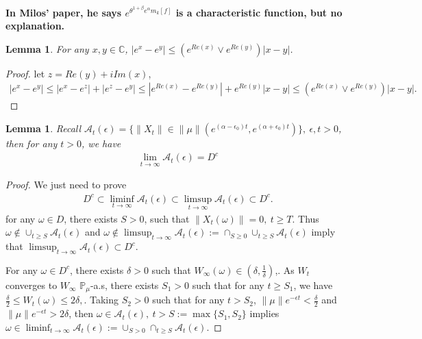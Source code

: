 \documentclass[12pt,oneside,english]{amsart}
\theoremstyle{plain}
\newtheorem{lem}[thm]{Lemma}
\theoremstyle{definition}
\numberwithin{equation}{section}
\begin{document}
{\bf In Milos' paper, he says $e^{\theta^{1+\beta}e^{\alpha}m_k[f]}$ is a characteristic function, but no explanation.}
\begin{lem}\label{lemma31}
For any $x,y\in \mathbb{C}$, $|e^x-e^y|\leq (e^{Re(x)}\vee e^{Re(y)})|x-y|$.
\end{lem}
\begin{proof}
let $z=Re(y)+iIm(x)$,
\begin{align}\label{estim}
    |e^x-e^y|\leq|e^x-e^z|+|e^z-e^y|\leq |e^{Re(x)}-e^{Re(y)}|+e^{Re(y)}|x-y|\leq (e^{Re(x)}\vee e^{Re(y)})|x-y|.
\end{align}
\end{proof}
\begin{lem}\label{lemma32}
Recall $\mathcal{A}_t(\epsilon)=\{\|X_t\|\in\|\mu\|(e^{(\alpha-\epsilon_0)t},e^{(\alpha+\epsilon_0)t})\},~\epsilon,t>0$, then for any $t>0$, we have
\begin{align}
    \lim_{t\rightarrow\infty}\mathcal{A}_t(\epsilon)=D^c
\end{align}
\end{lem}
\begin{proof}
    We just need to prove 
    \begin{align}
        D^c \subset \liminf_{t\rightarrow\infty}\mathcal{A}_t(\epsilon)\subset \limsup_{t\rightarrow\infty}\mathcal{A}_t(\epsilon)\subset D^c.
    \end{align}
    for any $\omega\in D$, there exists $S>0$, such that $\|X_t(\omega)\|=0,~t\geq T$. Thus $\omega \notin \cup_{t\geq S}\mathcal{A}_t(\epsilon)$ and $\omega\notin  \limsup_{t\rightarrow\infty}\mathcal{A}_t(\epsilon):=\cap_{S\geq 0}\cup_{t\geq S}\mathcal{A}_t(\epsilon)$ imply that $\limsup_{t\rightarrow\infty}\mathcal{A}_t(\epsilon)\subset D^c$.
    
    For any $\omega \in D^c$, there exists $\delta>0$ such that $W_{\infty}(\omega)\in(\delta,\frac{1}{\delta})$,. As $W_t$ converges to $W_{\infty}$ $\mathbb{P}_{\mu}$-a.s, there exists $S_1>0$ such that for any $t\geq S_1$, we have $\frac{\delta}{2}\leq W_t(\omega)\leq 2\delta,$. Taking $S_2>0$ such that for any $t>S_2$, $\|\mu\|e^{-\epsilon t}<\frac{\delta}{2}$ and $\|\mu\|e^{-\epsilon t}>2\delta$, then $\omega\in \mathcal{A}_t(\epsilon),~t>S:=\max\{S_1,S_2\}$ implies $\omega \in \liminf_{t\rightarrow \infty}\mathcal{A}_t(\epsilon):=\cup_{S>0}\cap_{t\geq S}\mathcal{A}_t(\epsilon)$.
\end{proof}
\end{document}
